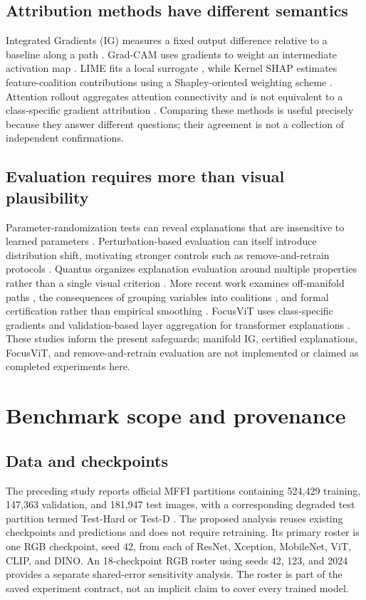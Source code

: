 \documentclass[conference,10pt,letterpaper]{IEEEtran}
\begin{document}
\subsection{Attribution methods have different semantics}
Integrated Gradients (IG) measures a fixed output difference relative to a baseline along a path \cite{sundararajan2017}. Grad-CAM uses gradients to weight an intermediate activation map \cite{selvaraju2017}. LIME fits a local surrogate \cite{ribeiro2016}, while Kernel SHAP estimates feature-coalition contributions using a Shapley-oriented weighting scheme \cite{lundberg2017}. Attention rollout aggregates attention connectivity and is not equivalent to a class-specific gradient attribution \cite{abnar2020}. Comparing these methods is useful precisely because they answer different questions; their agreement is not a collection of independent confirmations.

\subsection{Evaluation requires more than visual plausibility}
Parameter-randomization tests can reveal explanations that are insensitive to learned parameters \cite{adebayo2018}. Perturbation-based evaluation can itself introduce distribution shift, motivating stronger controls such as remove-and-retrain protocols \cite{hooker2019}. Quantus organizes explanation evaluation around multiple properties rather than a single visual criterion \cite{hedstrom2023}. More recent work examines off-manifold paths \cite{zaher2024}, the consequences of grouping variables into coalitions \cite{zheng2025}, and formal certification rather than empirical smoothing \cite{anani2025}. FocusViT uses class-specific gradients and validation-based layer aggregation for transformer explanations \cite{ali2026}. These studies inform the present safeguards; manifold IG, certified explanations, FocusViT, and remove-and-retrain evaluation are not implemented or claimed as completed experiments here.

\section{Benchmark scope and provenance}
\subsection{Data and checkpoints}
The preceding study reports official MFFI partitions containing 524,429 training, 147,363 validation, and 181,947 test images, with a corresponding degraded test partition termed Test-Hard or Test-D \cite{cunha2026}. The proposed analysis reuses existing checkpoints and predictions and does not require retraining. Its primary roster is one RGB checkpoint, seed 42, from each of ResNet, Xception, MobileNet, ViT, CLIP, and DINO. An 18-checkpoint RGB roster using seeds 42, 123, and 2024 provides a separate shared-error sensitivity analysis. The roster is part of the saved experiment contract, not an implicit claim to cover every trained model.
\end{document}
